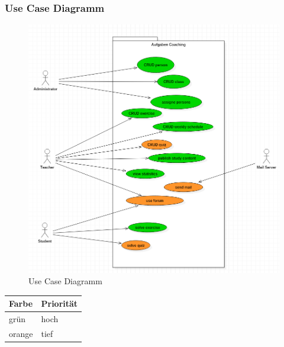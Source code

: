 \subsubsection{Use Case Diagramm}
\begin{minipage}{\textwidth}

\begin{figure}[H]
	\includegraphics[width=\textwidth, height=\textheight, keepaspectratio]{images/UseCaseDiagramm.png}
	\caption{Use Case Diagramm}
\end{figure}

\end{minipage}


\begin{tabular}{| p{1cm} | p{1.3cm}|}
	\hline
	\textbf{Farbe} & \textbf{Priorität} \\
	\hline	
	grün & hoch \\
	\hline
	orange & tief \\
	\hline
\end{tabular}


